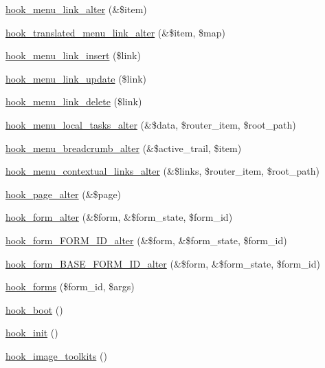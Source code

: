 \begin{DoxyCompactItemize}
\item 
\hyperlink{group__hooks_ga53f6d87f599e7f585ca84a7e0874df81}{hook\_\-menu\_\-link\_\-alter} (\&\$item)
\item 
\hyperlink{group__hooks_ga5b5395b90c4987e29c6f6430fc066e8c}{hook\_\-translated\_\-menu\_\-link\_\-alter} (\&\$item, \$map)
\item 
\hyperlink{group__hooks_ga834a576b88ca7a08ce1244469fabb116}{hook\_\-menu\_\-link\_\-insert} (\$link)
\item 
\hyperlink{group__hooks_gafd2d5cc2a49cf37a637201eb76a41d1d}{hook\_\-menu\_\-link\_\-update} (\$link)
\item 
\hyperlink{group__hooks_gaf08037b21bd31aa8d2b12e988da7e2fb}{hook\_\-menu\_\-link\_\-delete} (\$link)
\item 
\hyperlink{group__hooks_gac828fb6b28f1a8bb01c444a9b2331f5f}{hook\_\-menu\_\-local\_\-tasks\_\-alter} (\&\$data, \$router\_\-item, \$root\_\-path)
\item 
\hyperlink{group__hooks_ga5a6dd6ead08b6dab4fe1307eb599e34a}{hook\_\-menu\_\-breadcrumb\_\-alter} (\&\$active\_\-trail, \$item)
\item 
\hyperlink{group__hooks_ga2731120f62502453acd650710f8252b9}{hook\_\-menu\_\-contextual\_\-links\_\-alter} (\&\$links, \$router\_\-item, \$root\_\-path)
\item 
\hyperlink{group__hooks_gaa965aa8f38b48aed1a19c556c199145f}{hook\_\-page\_\-alter} (\&\$page)
\item 
\hyperlink{group__hooks_ga6df3cea27ae1407aeef4eae5444cb213}{hook\_\-form\_\-alter} (\&\$form, \&\$form\_\-state, \$form\_\-id)
\item 
\hyperlink{group__hooks_ga8d4a4089551493d55911bd5c4f218264}{hook\_\-form\_\-FORM\_\-ID\_\-alter} (\&\$form, \&\$form\_\-state, \$form\_\-id)
\item 
\hyperlink{group__hooks_gaf0cfc224a88c8823da68856c30a4841a}{hook\_\-form\_\-BASE\_\-FORM\_\-ID\_\-alter} (\&\$form, \&\$form\_\-state, \$form\_\-id)
\item 
\hyperlink{group__hooks_gaa764fee74b85797f75c0c923cad628d5}{hook\_\-forms} (\$form\_\-id, \$args)
\item 
\hyperlink{group__hooks_ga9ac1dfffdc69471a3d00d67503c71577}{hook\_\-boot} ()
\item 
\hyperlink{group__hooks_ga74edef0c463436fdbb1f92ef367db051}{hook\_\-init} ()
\item 
\hyperlink{group__hooks_ga9abe202036afcc6a3cc97ccc2c13ab29}{hook\_\-image\_\-toolkits} ()
\item 

\end{DoxyCompactItemize}
